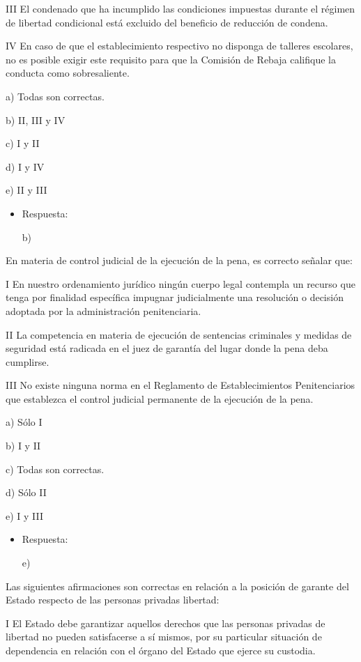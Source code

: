 \documentclass[letterpaper, 11pt]{article}
\begin{document}
III El condenado que ha incumplido las condiciones impuestas durante
el régimen de libertad condicional está excluido del beneficio de
reducción de condena.

IV En caso de que el establecimiento respectivo no disponga de
talleres escolares, no es posible exigir este requisito para que la
Comisión de Rebaja califique la conducta como sobresaliente.


a) Todas son correctas.


b) II, III y IV

c) I y II

d) I y IV

e) II y III

\begin{itemize}
\item Respuesta:

b)
\end{itemize}


En materia de control judicial de la ejecución de la pena, es correcto
señalar que:

I En nuestro ordenamiento jurídico ningún cuerpo legal contempla un
recurso que tenga por finalidad específica impugnar judicialmente una
resolución o decisión adoptada por la administración penitenciaria.

II La competencia en materia de ejecución de sentencias criminales y
medidas de seguridad está radicada en el juez de garantía del lugar
donde la pena deba cumplirse.

III No existe ninguna norma en el Reglamento de Establecimientos
Penitenciarios que establezca el control judicial permanente de la
ejecución de la pena.

a) Sólo I

b) I y II

c) Todas son correctas.


d) Sólo II

e) I y III

\begin{itemize}
\item Respuesta:

e)
\end{itemize}


Las siguientes afirmaciones son correctas en relación a la posición de
garante del Estado respecto de las personas privadas libertad:


I El Estado debe garantizar aquellos derechos que las personas
privadas de libertad no pueden satisfacerse a sí mismos, por su
particular situación de dependencia en relación con el órgano del
Estado que ejerce su custodia.
\end{document}
